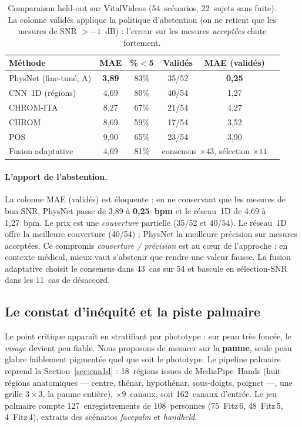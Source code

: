 \documentclass[11pt]{article}
\begin{document}
\begin{table}[h]
\centering
\caption{Comparaison held-out sur VitalVideos (54~scénarios, 22~sujets sans fuite).
La colonne \og{}validés\fg{} applique la politique d'abstention (on ne retient que les
mesures de SNR $>-1$~dB) : l'erreur sur les mesures \emph{acceptées} chute
fortement.}
\label{tab:visage}
\begin{tabular}{lccccc}
\toprule
Méthode & MAE & \%$<$5 & Validés & MAE (validés) \\
\midrule
PhysNet (fine-tuné, A) & \textbf{3{,}89} & 83\% & 35/52 & \textbf{0{,}25} \\
CNN~1D (régions)       & 4{,}69 & 80\% & 40/54 & 1{,}27 \\
CHROM-ITA              & 8{,}27 & 67\% & 21/54 & 4{,}27 \\
CHROM                  & 8{,}69 & 59\% & 17/54 & 3{,}52 \\
POS                    & 9{,}90 & 65\% & 23/54 & 3{,}90 \\
\midrule
Fusion adaptative      & 4{,}69 & 81\% & \multicolumn{2}{c}{consensus $\times43$, sélection $\times11$} \\
\bottomrule
\end{tabular}
\end{table}

\paragraph{L'apport de l'abstention.} La colonne \og{}MAE (validés)\fg{} est éloquente : en
ne conservant que les mesures de bon SNR, PhysNet passe de 3{,}89 à
\textbf{0{,}25~bpm} et le réseau~1D de 4{,}69 à 1{,}27~bpm. Le prix est une
\emph{couverture} partielle (35/52 et 40/54). Le réseau~1D offre la meilleure
couverture (40/54) ; PhysNet la meilleure précision sur mesures acceptées. Ce
compromis \emph{couverture / précision} est au c\oe{}ur de l'approche : en contexte
médical, mieux vaut s'abstenir que rendre une valeur fausse. La fusion adaptative
choisit le consensus dans 43~cas sur 54 et bascule en sélection-SNR dans les
11~cas de désaccord.

\subsection{Le constat d'inéquité et la piste palmaire}
\label{sec:paume}
Le point critique apparaît en stratifiant par phototype : sur peau très foncée, le
\emph{visage} devient peu fiable. Nous proposons de mesurer sur la \textbf{paume},
seule peau glabre faiblement pigmentée quel que soit le phototype. Le pipeline
palmaire reprend la Section~\ref{sec:cnn1d} : 18~régions issues de MediaPipe~Hands
(huit régions anatomiques --- centre, thénar, hypothénar, sous-doigts, poignet ---,
une grille $3\times3$, la paume entière), $\times 9$~canaux, soit 162~canaux
d'entrée. Le jeu palmaire compte 127~enregistrements de 108~personnes (75~Fitz\,6,
48~Fitz\,5, 4~Fitz\,4), extraits des scénarios \emph{facepalm} et \emph{handheld}.
\end{document}
